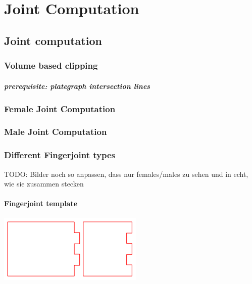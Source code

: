 \documentclass[../ClassicThesis.tex]{subfiles}
\begin{document}
\chapter{Joint Computation}\label{ch:joints}


\section{Joint computation}

\subsection{Volume based clipping}
\paragraph{prerequisite: plategraph intersection lines}

\subsection{Female Joint Computation}
\subsection{Male Joint Computation}

\subsection{Different Fingerjoint types}
TODO: Bilder noch so anpassen, dass nur females/males zu sehen und in echt, wie sie zusammen stecken
\subsubsection{Fingerjoint template}
\includegraphics[width=0.5\columnwidth]{Images/fingerjoints.png}
\end{document}
